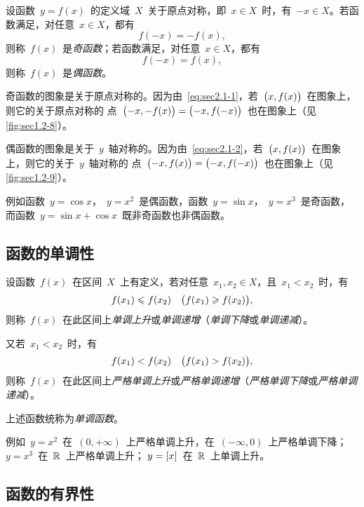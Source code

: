 设函数~$y=f(x)$~的定义域~$X$~关于原点对称，即~$x\in X$~时，有~$-x\in X$。若函数满足，对任意~$x\in X$，都有
\begin{equation}\label{eq:sec2.1-1}
f(-x)=-f(x),
\end{equation}
则称~$f(x)$~是\emph{奇函数}；若函数满足，对任意~$x\in X$，都有
\begin{equation}\label{eq:sec2.1-2}
f(-x)=f(x),
\end{equation}
则称~$f(x)$~是\emph{偶函数}。

奇函数的图象是关于原点对称的。因为由~\ref{eq:sec2.1-1}，若~$\bigl\lparen x,f(x)\bigr\rparen$~在图象上，则它的关于原点对称的
点~$\bigl\lparen-x,-f(x)\bigr\rparen=\bigl\lparen-x,f(-x)\bigr\rparen$~也在图象上（见\ref{fig:sec1.2-8}）。

偶函数的图象是关于~$y$~轴对称的。因为由~\ref{eq:sec2.1-2}，若~$\bigl\lparen x,f(x)\bigr\rparen$~在图象上，则它的关于~$y$~轴对称的
点~$\bigl\lparen-x,f(x)\bigr\rparen=\bigl\lparen-x,f(-x)\bigr\rparen$~也在图象上（见\ref{fig:sec1.2-9}）。

\begin{figure}
\begin{floatrow}[2]
          {\somefigure}
          {\somefigure}
\end{floatrow}
\end{figure}

例如函数~$y=\cos x$，~$y=x^2$~是偶函数，函数~$y=\sin x$，~$y=x^3$~是奇函数，而函数~$y=\sin x+\cos x$~既非奇函数也非偶函数。

\subsection{函数的单调性}

设函数~$f(x)$~在区间~$X$~上有定义，若对任意~$x_1,x_2\in X$，且~$x_1<x_2$~时，有
\[
  f(x_1)\leqslant f(x_2)\quad\bigl\lparen f(x_1)\geqslant f(x_2)\bigr\rparen,
\]
则称~$f(x)$~在此区间上\emph{单调上升}或\emph{单调递增}（\emph{单调下降}或\emph{单调递减}）。

又若~$x_1<x_2$~时，有
\[
  f(x_1)<f(x_2)\quad\bigl\lparen f(x_1)>f(x_2)\bigr\rparen,
\]
则称~$f(x)$~在此区间上\emph{严格单调上升}或\emph{严格单调递增}（\emph{严格单调下降}或\emph{严格单调递减}）。

上述函数统称为\emph{单调函数}。

例如~$y=x^2$~在~$(0,+\infty)$~上严格单调上升，在~$(-\infty,0)$~上严格单调下降；$y=x^3$~在~$\mathbb{R}$~上严格单调上升；%
$y=\lbrack x\rbrack$~在~$\mathbb{R}$~上单调上升。

\subsection{函数的有界性}

